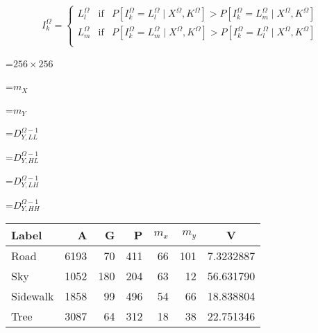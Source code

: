 {\newpage
\clearpage
\samepage \begin{equation}I^\Omega_k = \left \{ 
             \begin{array}{ccl}
             L_l^\Omega& \mbox{if} &P[I^\Omega_k = L_l^\Omega \mid X^\Omega, K^\Omega] > P[I^\Omega_k = L_m^\Omega \mid X^\Omega, K^\Omega] \\ 
             L_m^\Omega & \mbox{if} & P[I^\Omega_k = L_m^\Omega \mid X^\Omega, K^\Omega] > P[I^\Omega_k = L_l^\Omega \mid X^\Omega, K^\Omega] \\  
             \end{array}
             \right .
\label{eq:criteria}
\end{equation}
}

{\newpage
\clearpage
\samepage \setbox\sizebox=\hbox{$256 \times 256$}\box\sizebox
}

{\newpage
\clearpage
\samepage \setbox\sizebox=\hbox{$m_X$}\box\sizebox
}

{\newpage
\clearpage
\samepage \setbox\sizebox=\hbox{$m_Y$}\box\sizebox
}

{\newpage
\clearpage
\samepage \setbox\sizebox=\hbox{$D^{\Omega
- 1}_{Y,LL}$}\box\sizebox
}

{\newpage
\clearpage
\samepage \setbox\sizebox=\hbox{$D^{\Omega - 1}_{Y,HL}$}\box\sizebox
}

{\newpage
\clearpage
\samepage \setbox\sizebox=\hbox{$D^{\Omega - 1}_{Y,LH}$}\box\sizebox
}

{\newpage
\clearpage
\samepage \setbox\sizebox=\hbox{$D^{\Omega - 1}_{Y,HH}$}\box\sizebox
}

{\newpage
\clearpage
\samepage \begin{table}\begin{center}
\begin{tabular}{||l||r|r|r|r|r|c||} \hline \hline
Label    & A  & G  &  P & $m_x$ & $m_y$ &  V \\  \hline
Road     &6193& 70 & 411& 66    & 101   & 7.3232887  \\ 
Sky    &1052& 180& 204& 63    & 12    & 56.631790 \\ 
Sidewalk&1858& 99 & 496& 54    & 66    & 18.838804 \\ 
Tree    &3087& 64 & 312& 18    & 38    & 22.751346 \\  \hline
\end{tabular}
\end{center}  

\label{tab:road}
\end{table}
}

